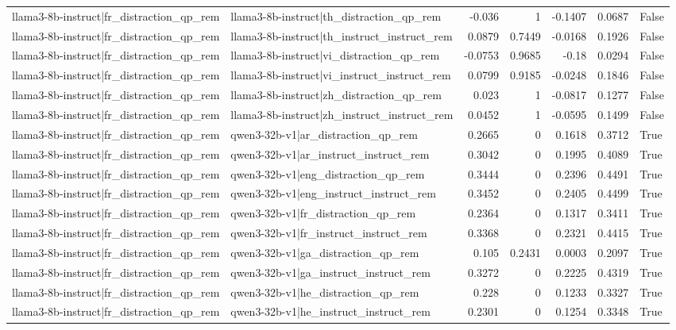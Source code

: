 \begin{table}
\begin{tabular}{l l r r r r l}
llama3-8b-instruct|fr_distraction_qp_rem & llama3-8b-instruct|th_distraction_qp_rem & -0.036 & 1 & -0.1407 & 0.0687 & False \\
llama3-8b-instruct|fr_distraction_qp_rem & llama3-8b-instruct|th_instruct_instruct_rem & 0.0879 & 0.7449 & -0.0168 & 0.1926 & False \\
llama3-8b-instruct|fr_distraction_qp_rem & llama3-8b-instruct|vi_distraction_qp_rem & -0.0753 & 0.9685 & -0.18 & 0.0294 & False \\
llama3-8b-instruct|fr_distraction_qp_rem & llama3-8b-instruct|vi_instruct_instruct_rem & 0.0799 & 0.9185 & -0.0248 & 0.1846 & False \\
llama3-8b-instruct|fr_distraction_qp_rem & llama3-8b-instruct|zh_distraction_qp_rem & 0.023 & 1 & -0.0817 & 0.1277 & False \\
llama3-8b-instruct|fr_distraction_qp_rem & llama3-8b-instruct|zh_instruct_instruct_rem & 0.0452 & 1 & -0.0595 & 0.1499 & False \\
llama3-8b-instruct|fr_distraction_qp_rem & qwen3-32b-v1|ar_distraction_qp_rem & 0.2665 & 0 & 0.1618 & 0.3712 & True \\
llama3-8b-instruct|fr_distraction_qp_rem & qwen3-32b-v1|ar_instruct_instruct_rem & 0.3042 & 0 & 0.1995 & 0.4089 & True \\
llama3-8b-instruct|fr_distraction_qp_rem & qwen3-32b-v1|eng_distraction_qp_rem & 0.3444 & 0 & 0.2396 & 0.4491 & True \\
llama3-8b-instruct|fr_distraction_qp_rem & qwen3-32b-v1|eng_instruct_instruct_rem & 0.3452 & 0 & 0.2405 & 0.4499 & True \\
llama3-8b-instruct|fr_distraction_qp_rem & qwen3-32b-v1|fr_distraction_qp_rem & 0.2364 & 0 & 0.1317 & 0.3411 & True \\
llama3-8b-instruct|fr_distraction_qp_rem & qwen3-32b-v1|fr_instruct_instruct_rem & 0.3368 & 0 & 0.2321 & 0.4415 & True \\
llama3-8b-instruct|fr_distraction_qp_rem & qwen3-32b-v1|ga_distraction_qp_rem & 0.105 & 0.2431 & 0.0003 & 0.2097 & True \\
llama3-8b-instruct|fr_distraction_qp_rem & qwen3-32b-v1|ga_instruct_instruct_rem & 0.3272 & 0 & 0.2225 & 0.4319 & True \\
llama3-8b-instruct|fr_distraction_qp_rem & qwen3-32b-v1|he_distraction_qp_rem & 0.228 & 0 & 0.1233 & 0.3327 & True \\
llama3-8b-instruct|fr_distraction_qp_rem & qwen3-32b-v1|he_instruct_instruct_rem & 0.2301 & 0 & 0.1254 & 0.3348 & True \\

\end{tabular}
\end{table}
